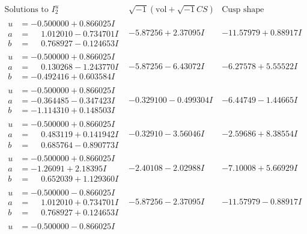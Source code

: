 \documentclass[1p]{elsarticle_modified}
\theoremstyle{definition}
\newcommand{\I}{\sqrt{-1}}
\begin{document}
$$\begin{array}{c|c|c}  
\text{Solutions to }I^u_{2}& \I (\text{vol} + \sqrt{-1}CS) & \text{Cusp shape}\\
 \hline 
\begin{aligned}
u &= -0.500000 + 0.866025 I \\
a &= \phantom{-}1.012010 - 0.734701 I \\
b &= \phantom{-}0.768927 - 0.124653 I\end{aligned}
 & -5.87256 + 2.37095 I & -11.57979 + 0.88917 I \\ \hline\begin{aligned}
u &= -0.500000 + 0.866025 I \\
a &= \phantom{-}0.130268 - 1.243770 I \\
b &= -0.492416 + 0.603584 I\end{aligned}
 & -5.87256 - 6.43072 I & -6.27578 + 5.55522 I \\ \hline\begin{aligned}
u &= -0.500000 + 0.866025 I \\
a &= -0.364485 - 0.347423 I \\
b &= -1.114310 + 0.148503 I\end{aligned}
 & -0.329100 - 0.499304 I & -6.44749 - 1.44665 I \\ \hline\begin{aligned}
u &= -0.500000 + 0.866025 I \\
a &= \phantom{-}0.483119 + 0.141942 I \\
b &= \phantom{-}0.685764 - 0.890773 I\end{aligned}
 & -0.32910 - 3.56046 I & -2.59686 + 8.38554 I \\ \hline\begin{aligned}
u &= -0.500000 + 0.866025 I \\
a &= -1.26091 + 2.18395 I \\
b &= \phantom{-}0.652039 + 1.129360 I\end{aligned}
 & -2.40108 - 2.02988 I & -7.10008 + 5.66929 I \\ \hline\begin{aligned}
u &= -0.500000 - 0.866025 I \\
a &= \phantom{-}1.012010 + 0.734701 I \\
b &= \phantom{-}0.768927 + 0.124653 I\end{aligned}
 & -5.87256 - 2.37095 I & -11.57979 - 0.88917 I \\ \hline\begin{aligned}
u &= -0.500000 - 0.866025 I \\

\end{aligned}
\end{array}$$
\end{document}
